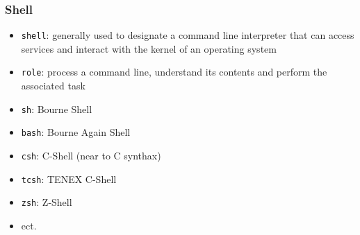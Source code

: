 \subsubsection{Shell}
\begin{frame}[fragile]{\subsubsecname}
  \begin{itemize}
    \item \texttt{shell}: generally used to designate a command line interpreter that can access services and interact with the kernel of an operating system
    \item \texttt{role}: process a command line, understand its contents and perform the associated task
    \item \texttt{sh}: Bourne Shell
    \item \texttt{bash}: Bourne Again Shell
    \item \texttt{csh}: C-Shell (near to C synthax)
    \item \texttt{tcsh}: TENEX C-Shell
    \item \texttt{zsh}: Z-Shell
    \item ect.
  \end{itemize}
\end{frame}
